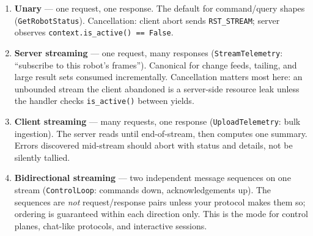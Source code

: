 \begin{enumerate}
  \item \textbf{Unary} --- one request, one response. The default for
        command/query shapes (\texttt{GetRobotStatus}). Cancellation: client
        abort sends \texttt{RST\_STREAM}; server observes
        \texttt{context.is\_active() == False}.
  \item \textbf{Server streaming} --- one request, many responses
        (\texttt{StreamTelemetry}: ``subscribe to this robot's frames'').
        Canonical for change feeds, tailing, and large result sets consumed
        incrementally. Cancellation matters most here: an unbounded stream the
        client abandoned is a server-side resource leak unless the handler
        checks \texttt{is\_active()} between yields.
  \item \textbf{Client streaming} --- many requests, one response
        (\texttt{UploadTelemetry}: bulk ingestion). The server reads until
        end-of-stream, then computes one summary. Errors discovered mid-stream
        should abort with status and details, not be silently tallied.
  \item \textbf{Bidirectional streaming} --- two independent message sequences
        on one stream (\texttt{ControlLoop}: commands down, acknowledgements
        up). The sequences are \emph{not} request/response pairs unless your
        protocol makes them so; ordering is guaranteed within each direction
        only. This is the mode for control planes, chat-like protocols, and
        interactive sessions.
\end{enumerate}

